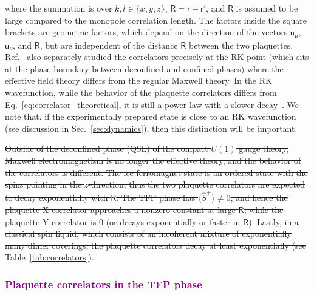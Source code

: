 \documentclass[twocolumn,superscriptaddress,amsmath,amssymb,aps,prx,nofootinbib]{revtex4-2}
\newcommand{\dual}[1]{\boldsymbol{\mathsf{#1}}}
\newcommand{\newtext}[1]{\textcolor{purple}{#1}}
\begin{document}
where the summation is over $k,l \in \{ x,y,z \}$, $\dual{R} = \dual{r} - \dual{r}'$, and $\mathsf{R}$ is assumed to be large compared to the monopole correlation length. The factors inside the square brackets are geometric factors, which depend on the direction of the vectors $\dual{u}_\mu$, $\dual{u}_\nu$, and $\dual{R}$, but are  independent of the distance $\mathsf{R}$ between the two plaquettes. Ref.~\cite{hermele2004} also separately studied the correlators precisely at the RK point (which sits at the phase boundary between deconfined and confined phases) where the effective field theory differs from the regular Maxwell theory. In the RK wavefunction, while the behavior of the plaquette correlators differs from Eq.~\eqref{eq:correlator_theoretical}, it is still a power law with a slower decay~\cite{hermele2004}. We note that, if the experimentally prepared state is close to an RK wavefunction (see discussion in Sec.~\ref{sec:dynamics}), then this distinction will be important.

\sout{Outside of the deconfined phase (QSL) of the compact $U(1)$ gauge theory, Maxwell electromagnetism is no longer the effective theory, and the behavior of the correlators is different. The ice ferromagnet state is an ordered state with the spins pointing in the $z$-direction,  thus the two plaquette correlators are expected to decay exponentially with $\mathsf{R}$. The TFP phase  has $\langle \hat{S}^+ \rangle \neq 0$, and hence the plaquette X correlator approaches a nonzero constant at large $\mathsf{R}$, while the plaquette Y correlator is 0 (or decays exponentially or faster in $\mathsf{R}$). Lastly, in a classical spin liquid, which consists of an incoherent mixture of exponentially many dimer coverings, the plaquette correlators  decay at least exponentially (see Table~\ref{tab:correlators}).}

\newtext{\subsubsection{Plaquette correlators in the TFP phase}}
\end{document}
